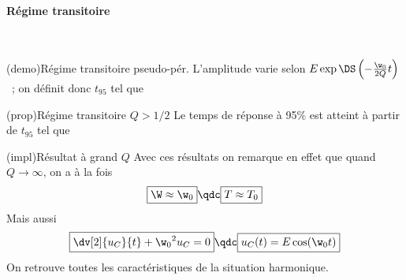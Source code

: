 \documentclass[../../main/main.tex]{subfiles}
\begin{document}
\paragraph{Régime transitoire}
~ \smallbreak

\begin{tcb*}[label=demo:transipseudo](demo){Régime transitoire pseudo-pér.}
	L'amplitude varie selon $E\exp \DS \left( -\frac{\w_0}{2Q}t \right)$~; on
	définit donc $t_{95}$ tel que
\end{tcb*}

\begin{tcb*}[label=prop:transipseudo](prop){Régime transitoire $Q > 1/2$}
	Le temps de réponse à 95\% est atteint à partir de $t_{95}$ tel que
	\vspace{-15pt}
\end{tcb*}

\begin{tcb}[label=impl:pseudograndQ](impl){Résultat à grand $Q$}
	Avec ces résultats on remarque en effet que quand $Q \rightarrow \infty$, on
	a à la fois
	\begin{equation*}
		\boxed{\W \approx \w_0} \qdc \boxed{T \approx T_0}
	\end{equation*}
	Mais aussi
	\begin{equation*}
		\boxed{\dv[2]{u_C}{t} + \w_0{}^2u_C = 0} \qdc \boxed{u_C(t) = E\cos(\w_0t)}
	\end{equation*}
	On retrouve toutes les caractéristiques de la situation harmonique.
\end{tcb}
\end{document}
